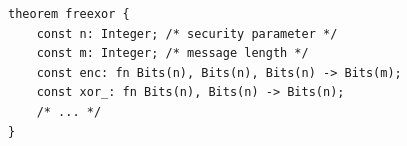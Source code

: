 \begin{longlisting}
\begin{verbatim}
theorem freexor {
    const n: Integer; /* security parameter */
    const m: Integer; /* message length */
    const enc: fn Bits(n), Bits(n), Bits(n) -> Bits(m); 
    const xor_: fn Bits(n), Bits(n) -> Bits(n);
    /* ... */
}
\end{verbatim}
\caption{Parameters in theorem }
\label{lst:domino-freexor-params}
\end{longlisting}